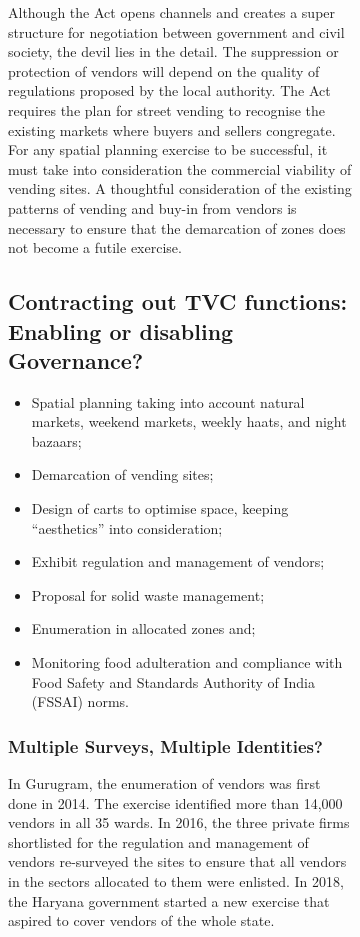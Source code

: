 \documentclass[a4paper, 12pt, twoside]{article}
\begin{document}
\begin{figure}
{\begin{figure}
Although the Act opens channels and creates a super structure for negotiation between government and civil society, the devil lies in the detail. The suppression or protection of vendors will depend on the quality of regulations proposed by the local authority. The Act requires the plan for street vending to recognise the existing markets where buyers and sellers congregate. For any spatial planning exercise to be successful, it must take into consideration the commercial viability of vending sites. A thoughtful consideration of the existing patterns of vending and buy-in from vendors is necessary to ensure that the demarcation of zones does not become a futile exercise.

\subsection*{Contracting out TVC functions: Enabling or disabling Governance?}

\begin{itemize}
\item Spatial planning taking into account natural markets, weekend markets, weekly haats, and night bazaars;
\item Demarcation of vending sites;
\item Design of carts to optimise space, keeping “aesthetics” into consideration;
\item Exhibit regulation and management of vendors;
\item Proposal for solid waste management;
\item Enumeration in allocated zones and;
\item Monitoring food adulteration and compliance with Food Safety and Standards Authority of India (FSSAI) norms.
\end{itemize}


\subsubsection*{Multiple Surveys, Multiple Identities?}

In Gurugram, the enumeration of vendors was first done in 2014. The exercise identified more than 14,000 vendors in all 35 wards. In 2016, the three private firms shortlisted for the regulation and management of vendors re-surveyed the sites to ensure that all vendors in the sectors allocated to them were enlisted. In 2018, the Haryana government started a new exercise that aspired to cover vendors of the whole state. \\


\end{figure}}
\end{figure}
\end{document}
